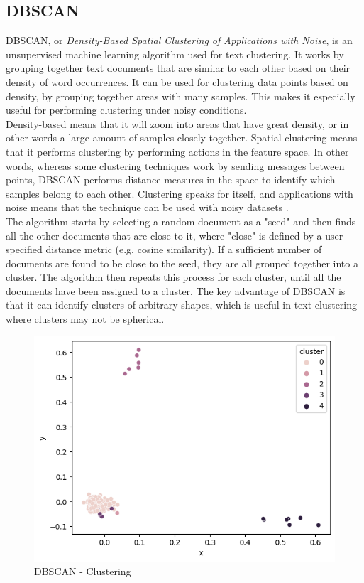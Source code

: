 \documentclass[fleqn,10pt]{SelfArx} %
\begin{document}
\subsection{DBSCAN}
DBSCAN, or \textit{Density-Based Spatial Clustering of Applications with Noise}, is an unsupervised machine learning algorithm used for text clustering.  It works by grouping together text documents that are similar to each other based on their density of word occurrences. It can be used for clustering data points based on density, by grouping together areas with many samples. This makes it especially useful for performing clustering under noisy conditions.\\
Density-based means that it will zoom into areas that have great density, or in other words a large amount of samples closely together. Spatial clustering means that it performs clustering by performing actions in the feature space. In other words, whereas some clustering techniques work by sending messages between points, DBSCAN performs distance measures in the space to identify which samples belong to each other. Clustering speaks for itself, and applications with noise means that the technique can be used with noisy datasets \cite{DBSCAN}.\\
The algorithm starts by selecting a random document as a "seed" and then finds all the other documents that are close to it, where "close" is defined by a user-specified distance metric (e.g. cosine similarity). If a sufficient number of documents are found to be close to the seed, they are all grouped together into a cluster. The algorithm then repeats this process for each cluster, until all the documents have been assigned to a cluster. The key advantage of DBSCAN is that it can identify clusters of arbitrary shapes, which is useful in text clustering where clusters may not be spherical.

\begin{figure}[H]
\begin{center}
  \includegraphics[scale=0.5]{./images/dbscan.png}
\end{center}
  \caption{DBSCAN - Clustering}
\end{figure}
\end{document}
